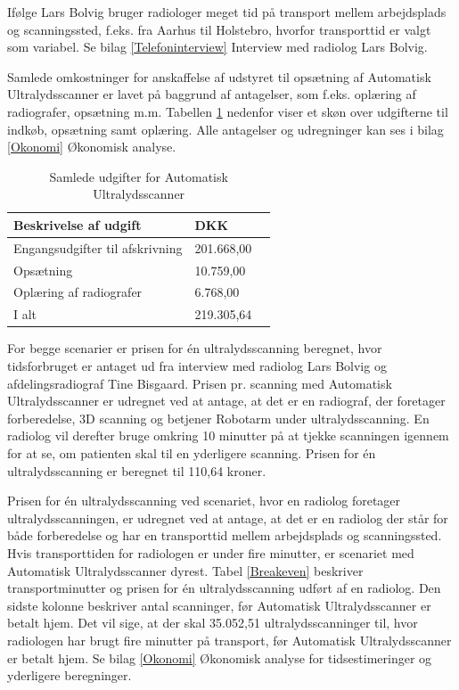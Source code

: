 Ifølge Lars Bolvig bruger radiologer meget tid på transport mellem arbejdsplads og scanningssted, f.eks. fra Aarhus til Holstebro, hvorfor transporttid er valgt som variabel. Se bilag \ref{Telefoninterview} Interview med radiolog Lars Bolvig. 

Samlede omkostninger for anskaffelse af udstyret til opsætning af Automatisk Ultralydsscanner er lavet på baggrund af antagelser, som f.eks. oplæring af radiografer, opsætning m.m. Tabellen \ref{FasteOmkostninger} nedenfor viser et skøn over udgifterne til indkøb, opsætning samt oplæring. Alle antagelser og udregninger kan ses i bilag \ref{Okonomi} Økonomisk analyse.

\begin{table}[htb]
\centering
\begin{tabular}{ | l | l | p{} | }
\hline
\textbf{Beskrivelse af udgift} & \textbf{DKK} \\\hline
Engangsudgifter til afskrivning & 201.668,00 \\\hline
Opsætning & 10.759,00 \\\hline
Oplæring af radiografer & 6.768,00 \\\hline
I alt & 219.305,64 \\\hline
\end{tabular}
\caption{Samlede udgifter for Automatisk Ultralydsscanner}
\label{FasteOmkostninger}
\end{table}

For begge scenarier er prisen for én ultralydsscanning beregnet, hvor tidsforbruget er antaget ud fra interview med radiolog Lars Bolvig og afdelingsradiograf Tine Bisgaard. Prisen pr. scanning med Automatisk Ultralydsscanner er udregnet ved at antage, at det er en radiograf, der foretager forberedelse, 3D scanning og betjener Robotarm under ultralydsscanning. En radiolog vil derefter bruge omkring 10 minutter på at tjekke scanningen igennem for at se, om patienten skal til en yderligere scanning. Prisen for én ultralydsscanning er beregnet til 110,64 kroner. 

Prisen for én ultralydsscanning ved scenariet, hvor en radiolog foretager ultralydsscanningen, er udregnet ved at antage, at det er en radiolog der står for både forberedelse og har en transporttid mellem arbejdsplads og scanningssted. Hvis transporttiden for radiologen er under fire minutter, er scenariet med Automatisk Ultralydsscanner dyrest. Tabel \ref{Breakeven} beskriver transportminutter og prisen for én ultralydsscanning udført af en radiolog. Den sidste kolonne beskriver antal scanninger, før Automatisk Ultralydsscanner er betalt hjem. Det vil sige, at der skal 35.052,51 ultralydsscanninger til, hvor radiologen har brugt fire minutter på transport, før Automatisk Ultralydsscanner er betalt hjem. Se bilag \ref{Okonomi} Økonomisk analyse for tidsestimeringer og yderligere beregninger. 

